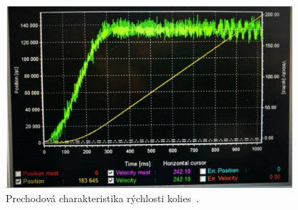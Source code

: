 \begin{figure}[!htbp]
	\begin{center}
		\includegraphics[width=0.95\textwidth]{img/robotSpeedChar.png}
	\end{center}
	\caption{Prechodová charakteristika rýchlosti kolies~\cite{timovyProjekt}. }
	\label{fig:prechChar}
\end{figure}

\clearpage
